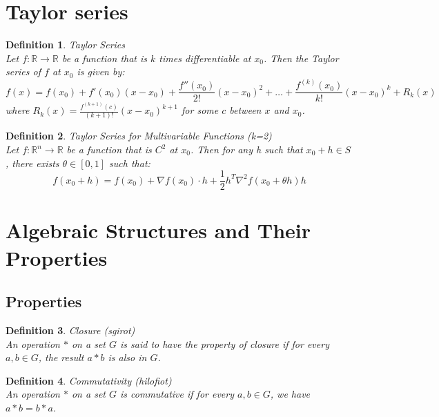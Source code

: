 \documentclass[11pt]{book} %
\newtheorem{definition}{Definition}[section]
\begin{document}
\section{Taylor series}
\begin{definition}{Taylor Series} \\
Let $f: \mathbb{R} \rightarrow \mathbb{R}$ be a function that is $k$ times differentiable at $x_0$. Then the Taylor series of $f$ at $x_0$ is given by:
\begin{equation}
    f(x) = f(x_0) + f'(x_0)(x-x_0) + \frac{f''(x_0)}{2!}(x-x_0)^2 + \ldots + \frac{f^{(k)}(x_0)}{k!}(x-x_0)^k + R_k(x)
\end{equation}
where $R_k(x) = \frac{f^{(k+1)}(c)}{(k+1)!}(x-x_0)^{k+1}$ for some $c$ between $x$ and $x_0$.
\end{definition}

\bigbreak

\begin{definition}{Taylor Series for Multivariable Functions (k=2) } \\
Let $f: \mathbb{R}^n \rightarrow \mathbb{R}$ be a function that is $C^2$ at $x_0$. Then for any h such that $x_0 + h \in S$, there exists $\theta \in [0,1]$ such that:
\begin{equation}
    f(x_0 + h) = f(x_0) + \nabla f(x_0) \cdot h + \frac{1}{2} h^T \nabla^2 f(x_0 + \theta h) h
\end{equation}
\end{definition}


\section{Algebraic Structures and Their Properties}

\subsection{Properties}
\begin{definition}{Closure (sgirot) } \\
An operation \(*\) on a set \(G\) is said to have the property of closure if for every \(a, b \in G\), the result \(a * b\) is also in \(G\).
\end{definition}

\begin{definition}{Commutativity (hilofiot)} \\
An operation \(*\) on a set \(G\) is commutative if for every \(a, b \in G\), we have \(a * b = b * a\).
\end{definition}
\end{document}
